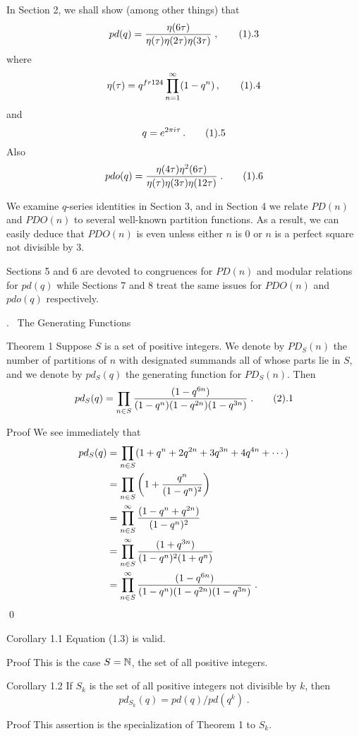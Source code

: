 In Section 2, we shall show (among other things) that
$$
	pd(q) = \fr{\eta(6\tau)}{\eta(\tau)\eta(2\tau)\eta(3\tau)}\;,
\tag1.3
$$
where
$$
	\eta(\tau) = q^{fr1{24}} \prod_{n=1}^{\infty} (1 - q^n)\,,
\tag1.4
$$
and
$$
	q = e^{2\pi i\tau}\,.
\tag1.5
$$
Also
$$
	pdo(q) = \fr{\eta(4\tau)\eta^2(6\tau)}{\eta(\tau)
	\eta(3\tau) \eta(12\tau)}\;.
\tag1.6
$$

We examine $q$-series identities in Section 3, and in Section 4 we
relate $PD(n)$ and $PDO(n)$ to several well-known partition functions.
As a result, we can easily deduce that $PDO(n)$ is even unless either
$n$ is $0$ or $n$ is a perfect square not divisible by 3.

Sections 5 and 6 are devoted to congruences for $PD(n)$ and modular
relations for $pd(q)$ while Sections 7 and 8 treat the same issues
for $PDO(n)$ and $pdo(q)$ respectively.

. \ The Generating Functions
\endsubhead

\proclaim
{Theorem 1} Suppose $S$ is a set of positive integers.  We denote by
$PD_S(n)$ the number of partitions of $n$ with designated summands all
of whose parts lie in $S$, and we denote by $pd_S(q)$ the generating
function for $PD_S(n)$.  Then
$$
	pd_S(q) = \prod_{n\in S} \fr{(1 - q^{6n})}{(1 - q^n)
	(1 - q^{2n})(1 - q^{3n})}\;.
\tag2.1
$$
\endproclaim

\demo
{Proof}  We see immediately that 
$$
\aligned
	pd_S(q) & = \prod_{n\in S} (1 + q^n + 2q^{2n} + 3q^{3n}
	+ 4q^{4n} + \cdots )   \\
	& = \prod_{n\in S} \left( 1 + \fr{q^n}{(1 - q^n)^2}\right)
	\\
	& = \prod_{n\in S}^{\infty} \fr{(1 - q^n + q^{2n})}{(1 - q^n)^2}
	\\
	& = \prod_{n\in S}^{\infty} \fr{(1 + q^{3n})}{(1 - q^n)^2(1 + q^n)}
	\\
	& = \prod_{n\in S}^{\infty} \fr{(1 - q^{6n})}{(1 - q^n)(1 - q^{2n})
	(1 - q^{3n})}\;.  
\endaligned
$$
\qed
\enddemo

\proclaim
{Corollary 1.1}  Equation (1.3) is valid.
\endproclaim

\demo
{Proof}  This is the case $S = \Bbb N$, the set of all positive 
integers.  \pf
\enddemo

\proclaim
{Corollary 1.2}  If $S_k$ is the set of all positive integers not 
divisible by $k$, then
$$
	pd_{S_k}(q) = pd(q)/pd(q^k)\;.
$$
\endproclaim

\demo
{Proof}  This assertion is the specialization of Theorem 1 to
$S_k$.  \pf
\enddemo

